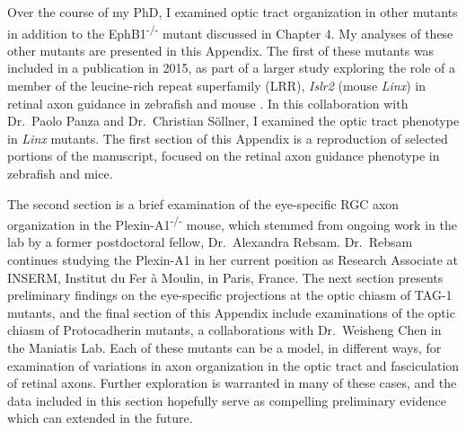 Over the course of my PhD, I examined optic tract organization in other mutants in addition to the EphB1\textsuperscript{-/-} mutant discussed in Chapter 4.
My analyses of these other mutants are presented in this Appendix.
The first of these mutants was included in a publication in 2015, as part of a larger study exploring the role of a member of the leucine-rich repeat superfamily (LRR), \emph{Islr2} (mouse \emph{Linx}) in retinal axon guidance in zebrafish and mouse \cite{panza2015lrr}.
In this collaboration with Dr.~Paolo Panza and Dr.~Christian S\"ollner, I examined the optic tract phenotype in \emph{Linx} mutants.
The first section of this Appendix is a reproduction of selected portions of the manuscript, focused on the retinal axon guidance phenotype in zebrafish and mice.

The second section is a brief examination of the eye-specific RGC axon organization in the Plexin-A1\textsuperscript{-/-} mouse, which stemmed from ongoing work in the lab by a former postdoctoral fellow, Dr.~Alexandra Rebsam.
Dr.~Rebsam continues studying the Plexin-A1 in her current position as Research Associate at INSERM, Institut du Fer \`a Moulin, in Paris, France.
The next section presents preliminary findings on the eye-specific projections at the optic chiasm of TAG-1 mutants, and the final section of this Appendix include examinations of the optic chiasm of Protocadherin mutants, a collaborations with Dr.~Weisheng Chen in the Maniatis Lab.
Each of these mutants can be a model, in different ways, for examination of variations in axon organization in the optic tract and fasciculation of retinal axons.
Further exploration is warranted in many of these cases, and the data included in this section hopefully serve as compelling preliminary evidence which can extended in the future.
